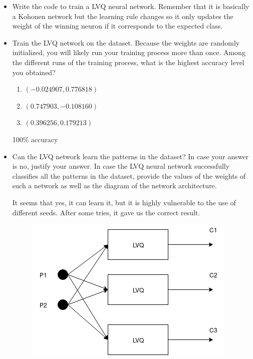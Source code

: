 \documentclass{article}
\begin{document}
\begin{itemize}
    \item  Write the code to train a LVQ neural network. Remember that it is basically a Kohonen network but the learning rule changes so it only updates the weight of the winning neuron if it corresponds to the expected class.
    
    \item Train the LVQ network on the dataset. Because the weights are randomly initialized, you will likely run your training process more than once. Among the different runs of the training process, what is the highest accuracy level you obtained?
    
    \begin{enumerate}
        \item $(-0.024907,  0.776818)$
        \item $(0.747903, -0.108160)$
        \item $(0.396256,  0.179213)$
    \end{enumerate}

    100\% accuracy

    
    \item Can the LVQ network learn the patterns in the dataset? In case your answer is no, justify your answer. In case the LVQ neural network successfully classifies all the patterns in the dataset, provide the values of the weights of such a network as well as the diagram of the network architecture.
    
    It seems that yes, it can learn it, but it is highly vulnerable to the use of different seeds. After some tries, it gave us the correct result.

    \begin{figure}[ht]
        \includegraphics[]{LVQ.png}        
    \end{figure}
    
\end{itemize}
\end{document}
